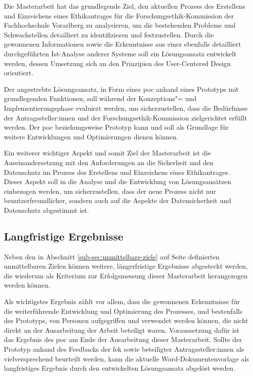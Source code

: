 \documentclass[a4paper,12pt,twoside]{scrreprt}
\begin{document}
Die Masterarbeit hat das grundlegende Ziel, den aktuellen Prozess des Erstellens und Einreichens eines Ethikantrages für die Forschungsethik-Kommission der Fachhochschule Vorarlberg zu analysieren, um die bestehenden Probleme und Schwachstellen detailliert zu identifizieren und festzustellen. Durch die gewonnenen Informationen sowie die Erkenntnisse aus einer ebenfalls detailliert durchgeführten Ist-Analyse anderer Systeme soll ein Lösungsansatz entwickelt werden, dessen Umsetzung sich an den Prinzipien des User-Centered Design orientiert.

Der angestrebte Lösungsansatz, in Form eines \ac{poc} anhand eines Prototyps mit grundlegenden Funktionen, soll während der Konzeptions"= und Implementierungsphase evaluiert werden, um sicherzustellen, dass die Bedürfnisse der Antragssteller:innen und der Forschungsethik-Kommission zielgerichtet erfüllt werden. Der \ac{poc} beziehungsweise Prototyp kann und soll als Grundlage für weitere Entwicklungen und Optimierungen dienen können.

Ein weiterer wichtiger Aspekt und somit Ziel der Masterarbeit ist die Auseinandersetzung mit den Anforderungen an die Sicherheit und den Datenschutz im Prozess des Erstellens und Einreichens eines Ethikantrages. Dieser Aspekt soll in die Analyse und die Entwicklung von Lösungsansätzen einbezogen werden, um sicherzustellen, dass der neue Prozess nicht nur benutzerfreundlicher, sondern auch auf die Aspekte der Datensicherheit und Datenschutz abgestimmt ist.

\subsection{Langfristige Ergebnisse}
\label{sub-sec:langfristige-ergebnisse}

Neben den in Abschnitt \ref{sub-sec:unmittelbare-ziele} auf Seite \pageref{sub-sec:unmittelbare-ziele} definierten unmittelbaren Zielen können weitere, längerfristige Ergebnisse abgesteckt werden, die wiederum als Kriterium zur Erfolgsmessung dieser Masterarbeit herangezogen werden können.

Als wichtigstes Ergebnis zählt vor allem, dass die gewonnenen Erkenntnisse für die weiterführende Entwicklung und Optimierung des Prozesses, und bestenfalls des Prototyps, von Personen aufgegriffen und verwendet werden können, die nicht direkt an der Ausarbeitung der Arbeit beteiligt waren. Voraussetzung dafür ist das Ergebnis des \ac{poc} am Ende der Ausarbeitung dieser Masterarbeit. Sollte der Prototyp anhand des Feedbacks der \acl{fek} sowie beteiligter Antragssteller:innen als vielversprechend beurteilt werden, kann die aktuelle Word-Dokumentenvorlage als langfristiges Ergebnis durch den entwickelten Lösungsansatz abgelöst werden.
\end{document}
